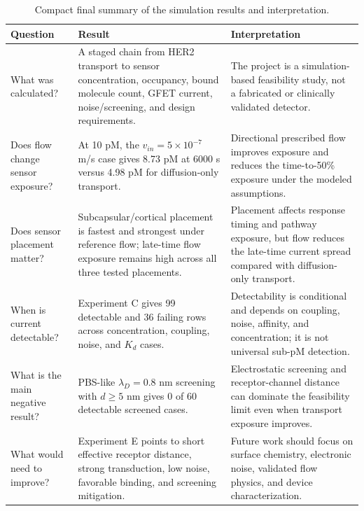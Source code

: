 \begin{table}[H]
\centering
\caption{Compact final summary of the simulation results and interpretation.}
\label{tab:compact_final_summary}
\small
\setlength{\tabcolsep}{4pt}
\begin{tabular}{@{}p{}p{}p{}@{}}
\toprule
\textbf{Question} & \textbf{Result} & \textbf{Interpretation}\\
\midrule
What was calculated? & A staged chain from HER2 transport to sensor concentration, occupancy, bound molecule count, GFET current, noise/screening, and design requirements. & The project is a simulation-based feasibility study, not a fabricated or clinically validated detector.\\
Does flow change sensor exposure? & At 10 pM, the $v_{in}=5\times10^{-7}$ m/s case gives 8.73 pM at 6000 s versus 4.98 pM for diffusion-only transport. & Directional prescribed flow improves exposure and reduces the time-to-50\% exposure under the modeled assumptions.\\
Does sensor placement matter? & Subcapsular/cortical placement is fastest and strongest under reference flow; late-time flow exposure remains high across all three tested placements. & Placement affects response timing and pathway exposure, but flow reduces the late-time current spread compared with diffusion-only transport.\\
When is current detectable? & Experiment C gives 99 detectable and 36 failing rows across concentration, coupling, noise, and $K_d$ cases. & Detectability is conditional and depends on coupling, noise, affinity, and concentration; it is not universal sub-pM detection.\\
What is the main negative result? & PBS-like $\lambda_D=0.8$ nm screening with $d\geq5$ nm gives 0 of 60 detectable screened cases. & Electrostatic screening and receptor-channel distance can dominate the feasibility limit even when transport exposure improves.\\
What would need to improve? & Experiment E points to short effective receptor distance, strong transduction, low noise, favorable binding, and screening mitigation. & Future work should focus on surface chemistry, electronic noise, validated flow physics, and device characterization.\\
\bottomrule
\end{tabular}
\end{table}

